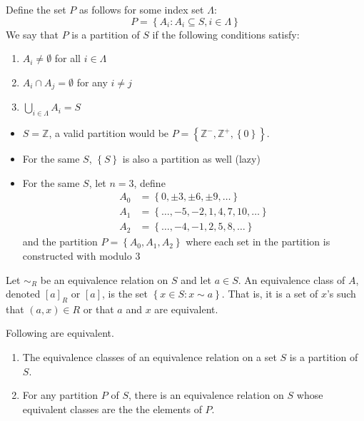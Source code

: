 \begin{definition}[Partition]
    Define the set \(P\) as follows for some index set \(\Lambda\):
    \[
        P = \left\{A_i : A_i \subseteq S, i \in \Lambda\right\}
    \]
    We say that \(P\) is a partition of \(S\) if the following conditions satisfy:
    \begin{enumerate}
        \item \(A_i \neq \emptyset\) for all \(i \in \Lambda\)
        \item \(A_i \cap A_j = \emptyset\) for any \(i \neq j\)
        \item \(\bigcup_{i \in \Lambda} A_i = S\)
    \end{enumerate}
\end{definition}

\begin{nexample}
    \phantom{wow}

    \begin{itemize}
        \item \(S = \mathbb{Z}\), a valid partition would be \(P = \left\{\mathbb{Z}^-, \mathbb{Z}^+, \left\{0\right\}\right\}\).
        \item For the same \(S\), \(\left\{S\right\}\) is also a partition as well (lazy)
        \item For the same \(S\), let \(n = 3\), define
            \[
            \begin{aligned}
                A_0 &= \left\{0, \pm 3, \pm 6, \pm 9, \ldots\right\} \\
                A_1 &= \left\{\ldots, -5, -2, 1, 4, 7, 10, \ldots\right\} \\
                A_2 &= \left\{\ldots, -4, -1, 2, 5, 8, \ldots\right\}
            \end{aligned}
            \]
            and the partition \(P = \left\{A_0, A_1, A_2\right\}\) where each set in the partition is constructed with modulo 3
    \end{itemize}
\end{nexample}

\begin{definition}
    Let \(\sim_{R}\) be an equivalence relation on \(S\) and let \(a \in S\). An equivalence class of \(A\), denoted \([a]_R\) or \([a]\), is the set \(\left\{x \in S : x \sim a\right\}\). That is, it is a set of \(x\)'s such that \((a, x) \in R\) or that \(a\) and \(x\) are equivalent.
\end{definition}

\begin{theorem}
    Following are equivalent.

    \begin{enumerate}
        \item The equivalence classes of an equivalence relation on a set \(S\) is a partition of \(S\).
        \item For any partition \(P\) of \(S\), there is an equivalence relation on \(S\) whose equivalent classes are the the elements of \(P\).
    \end{enumerate}
\end{theorem}

